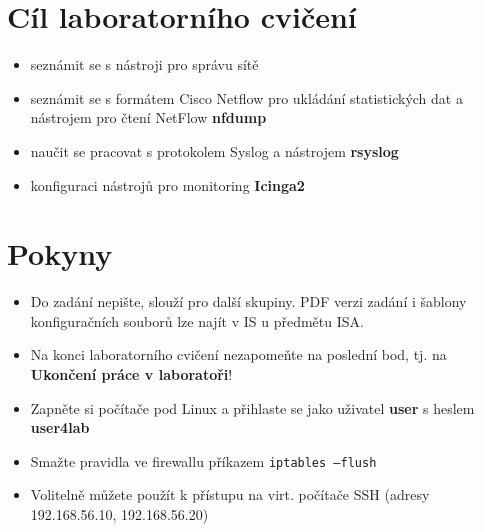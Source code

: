 %
\section*{Cíl laboratorního cvičení}
\begin{itemize}
  \item seznámit se s nástroji pro správu sítě
  \item seznámit se s formátem Cisco Netflow pro ukládání statistických dat a nástrojem pro čtení NetFlow {\bf nfdump}
  \item naučit se pracovat s protokolem Syslog a nástrojem {\bf rsyslog}
  \item konfiguraci nástrojů pro monitoring {\bf Icinga2}
\end{itemize}

\section*{Pokyny}
\begin{itemize}
  \item Do zadání nepište, slouží pro další skupiny. PDF verzi zadání
  i šablony konfiguračních souborů lze najít v IS u předmětu ISA.
  
  \item Na konci laboratorního cvičení nezapomeňte na poslední bod,
  tj. na {\bf Ukončení práce v laboratoři}!
  
  \item Zapněte si počítače pod Linux a přihlaste se jako uživatel {\bf user} s heslem {\bf user4lab}
  
  \item Smažte pravidla ve firewallu příkazem {\tt iptables --flush}
  
  \item Volitelně můžete použít k přístupu na virt. počítače SSH (adresy 192.168.56.10, 192.168.56.20)
\end{itemize}

\newpage

